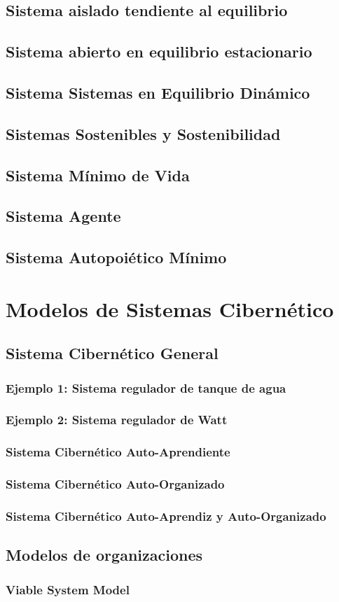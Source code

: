 \subsection{Sistema aislado tendiente al equilibrio}
\subsection{Sistema abierto en equilibrio estacionario}
\subsection{Sistema Sistemas en Equilibrio Dinámico}
\subsection{Sistemas Sostenibles y Sostenibilidad}
\subsection{Sistema Mínimo de Vida}
\subsection{Sistema Agente}
\subsection{Sistema Autopoiético Mínimo}
\section{Modelos de Sistemas Cibernético}

\subsection{Sistema Cibernético General}
\subsubsection{Ejemplo 1: Sistema regulador de tanque de agua}
\subsubsection{Ejemplo 2: Sistema regulador de Watt}
\subsubsection{Sistema Cibernético Auto-Aprendiente}
\subsubsection{Sistema Cibernético Auto-Organizado}
\subsubsection{Sistema Cibernético Auto-Aprendiz y Auto-Organizado}

\subsection{Modelos de organizaciones}
\subsubsection{Viable System Model}
